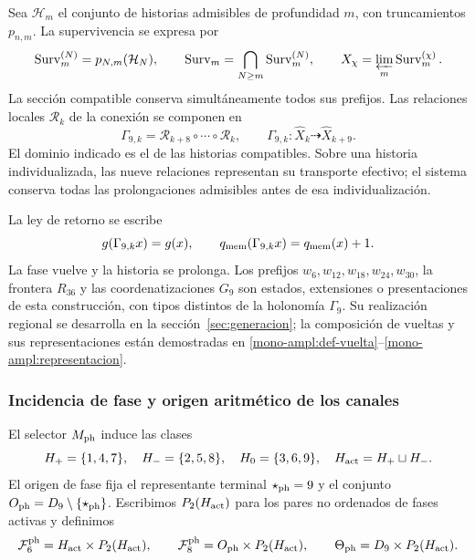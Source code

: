 Sea \(\mathcal H_m\) el conjunto de historias admisibles de profundidad
\(m\), con truncamientos \(p_{n,m}\). La supervivencia se expresa por
\[
 \operatorname{Surv}_m^{(N)}=p_{N,m}(\mathcal H_N),\qquad
 \operatorname{Surv}_m=\bigcap_{N\geq m}
 \operatorname{Surv}_m^{(N)},\qquad
 X_\chi=\varprojlim_m\operatorname{Surv}_m^{(\chi)}.
\]
La sección compatible conserva simultáneamente todos sus prefijos. Las
relaciones locales \(\mathcal R_k\) de la conexión se componen en
\begin{equation}
 \Gamma_{9,k}=\mathcal R_{k+8}\circ\cdots\circ\mathcal R_k,\qquad
 \Gamma_{9,k}:\widehat X_k\dashrightarrow\widehat X_{k+9}.
 \label{ii:tpk-holonomia}
\end{equation}
El dominio indicado es el de las historias compatibles. Sobre una historia
individualizada, las nueve relaciones representan su transporte efectivo;
el sistema conserva todas las prolongaciones admisibles antes de esa
individualización.

La ley de retorno se escribe
\[
 g(\Gamma_{9,k}x)=g(x),\qquad
 q_{\rm mem}(\Gamma_{9,k}x)=q_{\rm mem}(x)+1.
\]
La fase vuelve y la historia se prolonga. Los prefijos
\(w_6,w_{12},w_{18},w_{24},w_{30}\), la frontera \(R_{36}\) y las
coordenatizaciones \(G_9\) son estados, extensiones o presentaciones de esta
construcción, con tipos distintos de la holonomía \(\Gamma_9\).
Su realización regional se desarrolla en la sección~\ref{sec:generacion};
la composición de vueltas y sus representaciones están demostradas en
\ref{mono-ampl:def-vuelta}--\ref{mono-ampl:representacion}.

\subsubsection{Incidencia de fase y origen aritmético de los canales}

El selector \(M_{\rm ph}\) induce las clases
\[
 H_+=\{1,4,7\},\quad H_-=\{2,5,8\},\quad
 H_0=\{3,6,9\},\quad H_{\rm act}=H_+\sqcup H_-.
\]
El origen de fase fija el representante terminal
\(\star_{\rm ph}=9\) y el conjunto
\(O_{\rm ph}=D_9\setminus\{\star_{\rm ph}\}\).
Escribimos \(P_2(H_{\rm act})\) para los pares no ordenados de fases
activas y definimos
\[
 \mathcal F_6^{\rm ph}=H_{\rm act}\times P_2(H_{\rm act}),\qquad
 \mathcal F_8^{\rm ph}=O_{\rm ph}\times P_2(H_{\rm act}),\qquad
 \Theta_{\rm ph}=D_9\times P_2(H_{\rm act}).
\]


